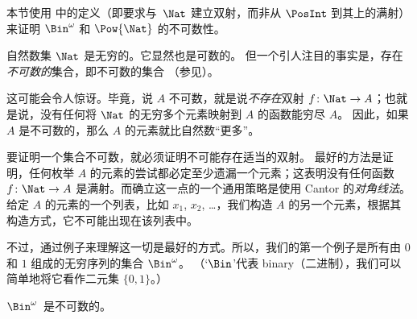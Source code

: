 \documentclass[../../../include/open-logic-section]{subfiles}
\begin{document}


\begin{editorial}
本节使用  中的定义（即要求与~$\Nat$ 建立双射，而非从 $\PosInt$ 到其上的满射）来证明 $\Bin^\omega$ 和 $\Pow{\Nat}$ 的不可数性。
\end{editorial}


\begin{explain}
自然数集 $\Nat$ 是无穷的。它显然也是可数的。
但一个引人注目的事实是，存在\emph{不可数的}集合，即不可数的集合
（参见）。

这可能会令人惊讶。毕竟，说 $A$ 不可数，就是说\emph{不存在}双射 $f
\colon \Nat \to A$；也就是说，没有任何将 $\Nat$ 的无穷多个元素映射到 $A$ 的函数能穷尽 $A$。
因此，如果 $A$ 是不可数的，那么 $A$ 的元素就比自然数“更多”。

要证明一个集合不可数，就必须证明不可能存在适当的双射。
最好的方法是证明，任何枚举 $A$ 的元素的尝试都必定至少遗漏一个元素；这表明没有任何函数 $f\colon \Nat
\to A$ 是满射。而确立这一点的一个通用策略是使用 Cantor 的\emph{对角线法}。
给定 $A$ 的元素的一个列表，比如 $x_1$, $x_2$, \dots，我们构造 $A$ 的另一个元素，根据其构造方式，它不可能出现在该列表中。

不过，通过例子来理解这一切是最好的方式。所以，我们的第一个例子是所有由 $0$ 和 $1$ 组成的无穷序列的集合 $\Bin^\omega$。
（‘$\Bin$’代表 binary（二进制），我们可以简单地将它看作二元集
$\{0,1\}$。）
\end{explain}

\begin{thm}
$\Bin^\omega$~是不可数的。
\end{thm}
\end{document}
